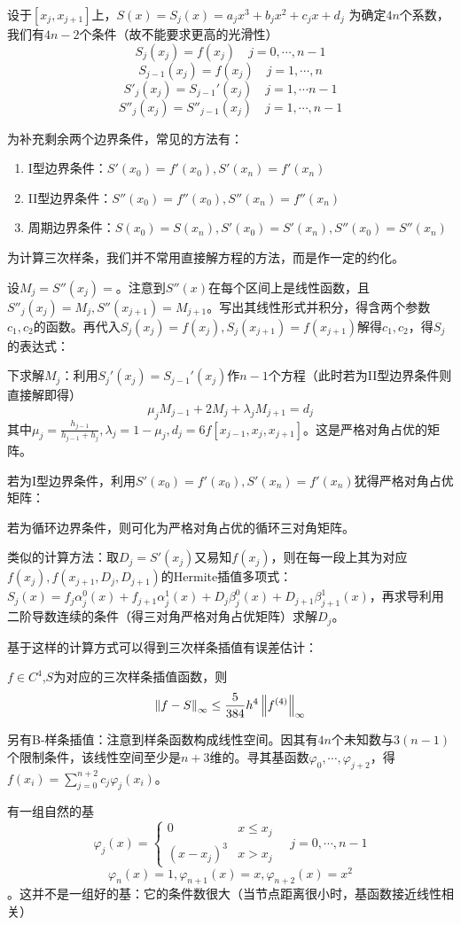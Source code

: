 \documentclass{ctexart}
\begin{document}
设于$[x_j,x_{j+1}]$上，$S(x)=S_j(x)=a_jx^3+b_jx^2+c_jx+d_j$
为确定$4n$个系数，我们有$4n-2$个条件（故不能要求更高的光滑性）
\[S_j(x_j)=f(x_j)\quad j=0,\cdots,n-1\]
\[S_{j-1}(x_j)=f(x_j)\quad j=1,\cdots,n\]
\[S'_j(x_j)=S_{j-1}'(x_j)\quad j=1,\cdots n-1\]
\[S''_j(x_j)=S''_{j-1}(x_j)\quad j=1,\cdots,n-1\]

为补充剩余两个边界条件，常见的方法有：
\begin{enumerate}
\item I型边界条件：$S'(x_0)=f'(x_0),S'(x_n)=f'(x_n)$
\item II型边界条件：$S''(x_0)=f''(x_0),S''(x_n)=f''(x_n)$
\item 周期边界条件：$S(x_0)=S(x_n),S'(x_0)=S'(x_n),S''(x_0)=S''(x_n)$
\end{enumerate}

为计算三次样条，我们并不常用直接解方程的方法，而是作一定的约化。

设$M_j=S''(x_j)=$。注意到$S''(x)$在每个区间上是线性函数，且$S''_j(x_j)=M_j,S''(x_{j+1})=M_{j+1}$。写出其线性形式并积分，得含两个参数$c_1,c_2$的函数。再代入$S_j(x_j)=f(x_j),S_j(x_{j+1})=f(x_{j+1})$解得$c_1,c_2$，得$S_j$的表达式：

下求解$M_j$：利用$S_j'(x_j)=S_{j-1}'(x_j)$作$n-1$个方程（此时若为II型边界条件则直接解即得）
\[\mu_jM_{j-1}+2M_j+\lambda_jM_{j+1}=d_j\]
其中$\mu_j=\frac{h_{j-1}}{h_{j-1}+h_j},\lambda_j=1-\mu_j,d_j=6f[x_{j-1},x_j,x_{j+1}]$。这是严格对角占优的矩阵。

若为I型边界条件，利用$S'(x_0)=f'(x_0),S'(x_n)=f'(x_n)$犹得严格对角占优矩阵：

若为循环边界条件，则可化为严格对角占优的循环三对角矩阵。

类似的计算方法：取$D_j=S'(x_j)$又易知$f(x_j)$，则在每一段上其为对应$f(x_j),f(x_{j+1},D_j,D_{j+1})$的Hermite插值多项式：$S_j(x)=f_j\alpha_j^0(x)+f_{j+1}\alpha_j^1(x)+D_j\beta_j^0(x)+D_{j+1}\beta_{j+1}^1(x)$，再求导利用二阶导数连续的条件（得三对角严格对角占优矩阵）求解$D_j$。

基于这样的计算方式可以得到三次样条插值有误差估计：
\begin{Thm}
$f\in C^4$,$S$为对应的三次样条插值函数，则
\[\left\|f-S \right\|_\infty\leq \frac{5}{384}h^4\left\|f^{(4)} \right\|_\infty\]
\end{Thm}

另有B-样条插值：注意到样条函数构成线性空间。因其有$4n$个未知数与$3(n-1)$个限制条件，该线性空间至少是$n+3$维的。寻其基函数$\varphi_0,\cdots,\varphi_{j+2}$，得$f(x_i)=\sum_{j=0}^{n+2}c_j\varphi_j(x_i)$。

有一组自然的基\[\varphi_j(x)=\begin{cases}0 & x\leq x_j\\ (x-x_j)^3& x>x_j\end{cases}\quad j=0,\cdots,n-1\]\[\varphi_n(x)=1,\varphi_{n+1}(x)=x,\varphi_{n+2}(x)=x^2\]。这并不是一组好的基：它的条件数很大（当节点距离很小时，基函数接近线性相关）
\end{document}
